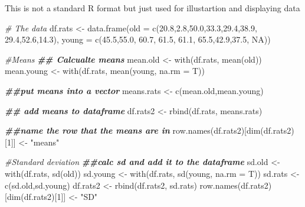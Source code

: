 \documentclass[
]{book}
\newenvironment{Shaded}{\begin{snugshade}}{\end{snugshade}}
\newcommand{\AttributeTok}[1]{\textcolor[rgb]{0.77,0.63,0.00}{#1}}
\newcommand{\CommentTok}[1]{\textcolor[rgb]{0.56,0.35,0.01}{\textit{#1}}}
\newcommand{\ConstantTok}[1]{\textcolor[rgb]{0.00,0.00,0.00}{#1}}
\newcommand{\DecValTok}[1]{\textcolor[rgb]{0.00,0.00,0.81}{#1}}
\newcommand{\DocumentationTok}[1]{\textcolor[rgb]{0.56,0.35,0.01}{\textbf{\textit{#1}}}}
\newcommand{\FloatTok}[1]{\textcolor[rgb]{0.00,0.00,0.81}{#1}}
\newcommand{\FunctionTok}[1]{\textcolor[rgb]{0.00,0.00,0.00}{#1}}
\newcommand{\NormalTok}[1]{#1}
\newcommand{\OtherTok}[1]{\textcolor[rgb]{0.56,0.35,0.01}{#1}}
\newcommand{\StringTok}[1]{\textcolor[rgb]{0.31,0.60,0.02}{#1}}
\begin{document}
This is not a standard R format but just used for illustartion and displaying data

\begin{Shaded}
\begin{Highlighting}[]
\CommentTok{\# The data}
\NormalTok{df.rats }\OtherTok{\textless{}{-}} \FunctionTok{data.frame}\NormalTok{(}\AttributeTok{old =} \FunctionTok{c}\NormalTok{(}\FloatTok{20.8}\NormalTok{,}\FloatTok{2.8}\NormalTok{,}\FloatTok{50.0}\NormalTok{,}\FloatTok{33.3}\NormalTok{,}\FloatTok{29.4}\NormalTok{,}\FloatTok{38.9}\NormalTok{, }\FloatTok{29.4}\NormalTok{,}\FloatTok{52.6}\NormalTok{,}\FloatTok{14.3}\NormalTok{),}
           \AttributeTok{young =} \FunctionTok{c}\NormalTok{(}\FloatTok{45.5}\NormalTok{,}\FloatTok{55.0}\NormalTok{, }\FloatTok{60.7}\NormalTok{, }\FloatTok{61.5}\NormalTok{, }\FloatTok{61.1}\NormalTok{, }\FloatTok{65.5}\NormalTok{,}\FloatTok{42.9}\NormalTok{,}\FloatTok{37.5}\NormalTok{, }\ConstantTok{NA}\NormalTok{))}


\CommentTok{\#Means}
\DocumentationTok{\#\# Calcualte means}
\NormalTok{mean.old }\OtherTok{\textless{}{-}} \FunctionTok{with}\NormalTok{(df.rats, }\FunctionTok{mean}\NormalTok{(old))}
\NormalTok{mean.young }\OtherTok{\textless{}{-}} \FunctionTok{with}\NormalTok{(df.rats, }\FunctionTok{mean}\NormalTok{(young, }\AttributeTok{na.rm =}\NormalTok{ T))}

\DocumentationTok{\#\#put means into a vector}
\NormalTok{means.rats }\OtherTok{\textless{}{-}} \FunctionTok{c}\NormalTok{(mean.old,mean.young)}

\DocumentationTok{\#\# add means to dataframe}
\NormalTok{df.rats2 }\OtherTok{\textless{}{-}} \FunctionTok{rbind}\NormalTok{(df.rats, means.rats)}

\DocumentationTok{\#\#name the row that the means are in}
\FunctionTok{row.names}\NormalTok{(df.rats2)[}\FunctionTok{dim}\NormalTok{(df.rats2)[}\DecValTok{1}\NormalTok{]] }\OtherTok{\textless{}{-}} \StringTok{"means"}

\CommentTok{\#Standard deviation}
\DocumentationTok{\#\#calc sd and add it to the dataframe}
\NormalTok{sd.old }\OtherTok{\textless{}{-}} \FunctionTok{with}\NormalTok{(df.rats, }\FunctionTok{sd}\NormalTok{(old))}
\NormalTok{sd.young }\OtherTok{\textless{}{-}} \FunctionTok{with}\NormalTok{(df.rats, }\FunctionTok{sd}\NormalTok{(young, }\AttributeTok{na.rm =}\NormalTok{ T))}
\NormalTok{sd.rats }\OtherTok{\textless{}{-}} \FunctionTok{c}\NormalTok{(sd.old,sd.young)}
\NormalTok{df.rats2 }\OtherTok{\textless{}{-}} \FunctionTok{rbind}\NormalTok{(df.rats2, sd.rats)}
\FunctionTok{row.names}\NormalTok{(df.rats2)[}\FunctionTok{dim}\NormalTok{(df.rats2)[}\DecValTok{1}\NormalTok{]] }\OtherTok{\textless{}{-}} \StringTok{"SD"}


\end{Highlighting}
\end{Shaded}
\end{document}
